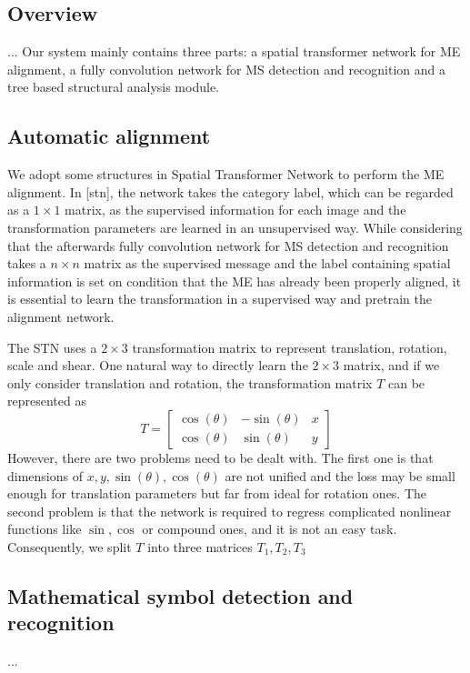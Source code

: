 \documentclass[10pt,conference,a4paper]{IEEEtran}
\begin{document}
	\subsection{Overview}
	...
	Our system mainly contains three parts: a spatial transformer network for ME alignment, a fully convolution network for MS detection and recognition and a tree based structural analysis module.
	\subsection{Automatic alignment}
	We adopt some structures in Spatial Transformer Network to perform the ME alignment. In [stn], the network takes the category label, which can be regarded as a $1 \times 1$ matrix, as the supervised information for each image and the transformation parameters are learned in an unsupervised way. While considering that the afterwards fully convolution network for MS detection and recognition takes a $n \times n$ matrix as the supervised message and the label containing spatial information is set on condition that the ME has already been properly aligned, it is essential to learn the transformation in a supervised way and pretrain the alignment network.
	
	The STN uses a $2 \times 3$ transformation matrix to represent translation, rotation, scale and shear. One natural way to directly learn the $2 \times 3$ matrix, and if we only consider translation and rotation, the transformation matrix $T$ can be represented as 
	\begin{equation}
		T = 
		\begin{bmatrix}
		\cos(\theta) & -\sin(\theta) & x\\ 
		\cos(\theta) & \sin(\theta) & y
		\end{bmatrix}
	\end{equation}
	However, there are two problems need to be dealt with. The first one is that dimensions of $x, y, \sin(\theta), \cos(\theta)$ are not unified and the loss may be small enough for translation parameters but far from ideal for rotation ones. The second problem is that the network is required to regress complicated nonlinear functions like $\sin, \cos$ or compound ones, and it is not an easy task. Consequently, we split $T$ into three matrices $T_1, T_2, T_3$ 
	
	
	 
		
	\subsection{Mathematical symbol detection and recognition}	
    ...
\end{document}
